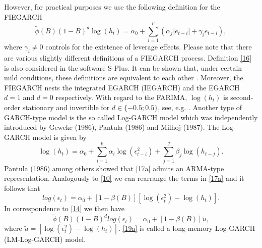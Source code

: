 \documentclass[12pt]{article}
\begin{document}
However, for practical purposes we use the following definition for the FIEGARCH
\begin{equation}
\label{16}
\tilde{\phi}(B)(1-B)^{d}\log(h_t)=\alpha_0+\sum_{i=1}^{p}(\alpha_j|e_{t-i}|+\gamma_ie_{t-i}),
\end{equation}
where $\gamma_i \neq 0$ controls for the existence of leverage effects. Please note that there are various slightly different definitions of a FIEGARCH process. Definition \eqref{16} is also considered in the software S-Plus. It can be shown that, under certain mild conditions, these definitions are equivalent to each other \citep{lopes2012theoretical}. Moreover, the FIEGARCH nests the integrated EGARCH (IEGARCH) and the EGARCH  $d=1$ and $d=0$ respectively. With regard to the FARIMA, ${\log(h_t)}$ is second-order stationary and invertible for $d\in\{-0.5;0.5\}$, see, e.g. \citet{hosking1981fractional}. Another type of GARCH-type model is the so called Log-GARCH model which was independently introduced by Geweke (1986), Pantula (1986) and Milhoj (1987). The Log-GARCH model is given by
\begin{equation}
\label{17a}
	\log(h_t)=\alpha_0+\sum_{i=1}^{p}\alpha_i\log(\epsilon_{t-i}^2)+\sum_{j=1}^{q}\beta_j \log (h_{t-j}).
\end{equation}
Pantula (1986) among others showed that \eqref{17a} admits an ARMA-type representation. Analogously to \eqref{10} we can rearrange the terms in \eqref{17a} and it follows that
\begin{equation}
[1-\alpha(B)-\beta(B)]log(\epsilon_t)=\alpha_0+[1-\beta(B)][\log(\epsilon_t^2)-\log(h_t)].	
\end{equation}  
In correspondence to \eqref{14} we then have
\begin{equation}
\label{19a}
\tilde{\phi}(B)(1-B)^d log(\epsilon_t)=\alpha_0+[1-\beta(B)]\tilde{u},	
\end{equation}
where $\tilde{u}=[\log(\epsilon_t^2)-\log(h_t)]$. \eqref{19a} is called a long-memory Log-GARCH (LM-Log-GARCH) model.
\end{document}
